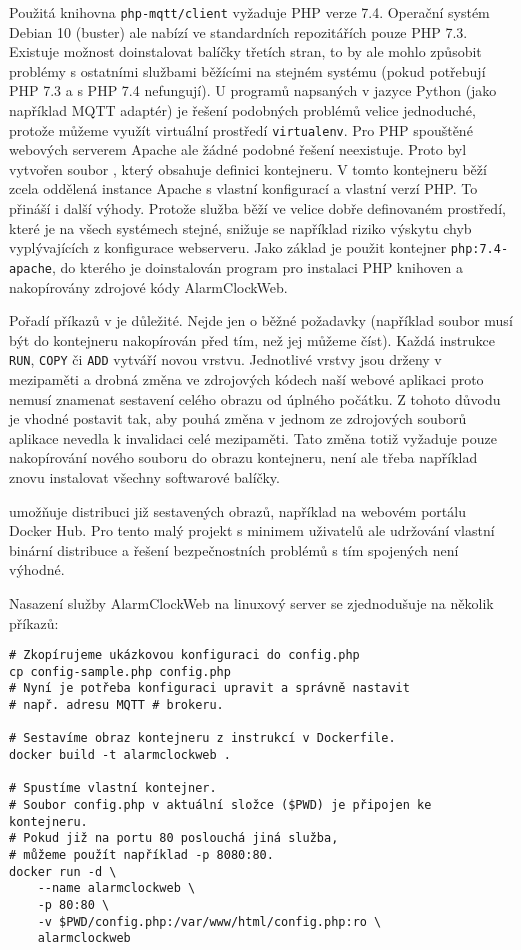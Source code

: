 
Použitá knihovna \texttt{php-mqtt/client} vyžaduje PHP verze 7.4. Operační
systém Debian 10 (buster) ale nabízí ve standardních repozitářích pouze PHP
7.3. Existuje možnost doinstalovat balíčky třetích stran, to by ale mohlo
způsobit problémy s ostatními službami běžícími na stejném systému (pokud
potřebují PHP 7.3 a s PHP 7.4 nefungují).
U programů napsaných v jazyce Python (jako například MQTT adaptér) je řešení
podobných problémů velice jednoduché, protože můžeme využít virtuální prostředí
\texttt{virtualenv}. Pro PHP spouštěné webových serverem Apache ale žádné
podobné řešení neexistuje.
Proto byl vytvořen soubor , který obsahuje definici
kontejneru. V tomto kontejneru běží zcela oddělená instance Apache s vlastní
konfigurací a vlastní verzí PHP. To přináší i další výhody. Protože služba běží
ve velice dobře definovaném prostředí, které je na všech systémech stejné,
snižuje se například riziko výskytu chyb vyplývajících z konfigurace
webserveru. Jako základ je použit kontejner \texttt{php:7.4-apache}, do kterého
je doinstalován program pro instalaci PHP knihoven 
a nakopírovány zdrojové kódy AlarmClockWeb.

Pořadí příkazů v  je důležité. Nejde jen o běžné požadavky
(například soubor musí být do kontejneru nakopírován před tím, než jej můžeme
číst). Každá instrukce \texttt{RUN}, \texttt{COPY} či \texttt{ADD} vytváří
novou vrstvu. Jednotlivé vrstvy jsou drženy v mezipaměti a drobná změna ve
zdrojových kódech naší webové aplikaci proto nemusí znamenat sestavení celého
obrazu od úplného počátku. Z tohoto důvodu je vhodné postavit
 tak, aby pouhá změna v jednom ze zdrojových souborů
aplikace nevedla k invalidaci celé mezipaměti. Tato změna totiž vyžaduje pouze
nakopírování nového souboru do obrazu kontejneru, není ale třeba například
znovu instalovat všechny softwarové balíčky.

 umožňuje distribuci již sestavených obrazů, například na
webovém portálu Docker Hub. Pro tento malý projekt s minimem uživatelů ale
udržování vlastní binární distribuce a řešení bezpečnostních problémů s tím
spojených není výhodné.


Nasazení služby AlarmClockWeb na linuxový server se zjednodušuje na několik
příkazů:
\begin{lstlisting}[language=mybash,style=numbers]
# Zkopírujeme ukázkovou konfiguraci do config.php
cp config-sample.php config.php
# Nyní je potřeba konfiguraci upravit a správně nastavit
# např. adresu MQTT # brokeru.

# Sestavíme obraz kontejneru z instrukcí v Dockerfile.
docker build -t alarmclockweb .

# Spustíme vlastní kontejner.
# Soubor config.php v aktuální složce ($PWD) je připojen ke kontejneru.
# Pokud již na portu 80 poslouchá jiná služba,
# můžeme použít například -p 8080:80.
docker run -d \
    --name alarmclockweb \
    -p 80:80 \
    -v $PWD/config.php:/var/www/html/config.php:ro \
    alarmclockweb
\end{lstlisting}
